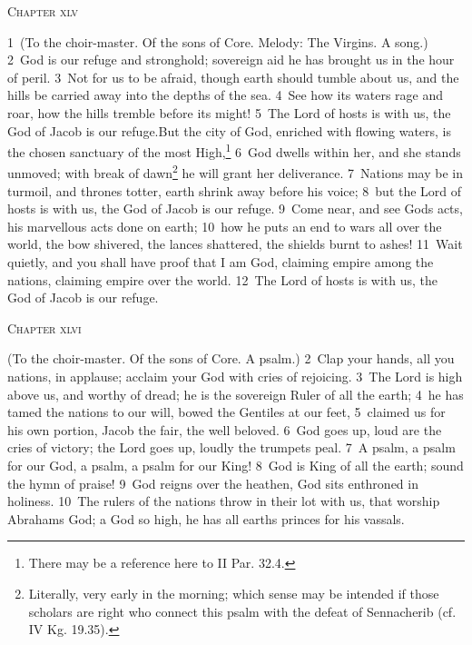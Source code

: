 \documentclass[10pt]{book} %
\begin{document}
\begin{large}\begin{center}\textsc{Chapter xlv}\end{center}\end{large}
\textcolor{benred8}{1}~(To the choir-master. Of the sons of Core. Melody: The Virgins. A song.)
\textcolor{benred8}{2}~God is our refuge and stronghold; sovereign aid he has brought us in the hour of peril. \textcolor{benred8}{3}~Not for us to be afraid, though earth should tumble about us, and the hills be carried away into the depths of the sea. \textcolor{benred8}{4}~See how its waters rage and roar, how the hills tremble before its might! \textcolor{benred8}{5}~The Lord of hosts is with us, the God of Jacob is our refuge.But the city of God, enriched with flowing waters, is the chosen sanctuary of the most High,\footnote[1]{There may be a reference here to II Par. 32.4.} \textcolor{benred8}{6}~God dwells within her, and she stands unmoved; with break of dawn\footnote[2]{Literally, \textasciigrave very early in the morning\textquotesingle ; which sense may be intended if those scholars are right who connect this psalm with the defeat of Sennacherib (cf. IV Kg. 19.35).} he will grant her deliverance. \textcolor{benred8}{7}~Nations may be in turmoil, and thrones totter, earth shrink away before his voice; \textcolor{benred8}{8}~but the Lord of hosts is with us, the God of Jacob is our refuge. \textcolor{benred8}{9}~Come near, and see God\textquotesingle s acts, his marvellous acts done on earth; \textcolor{benred8}{10}~how he puts an end to wars all over the world, the bow shivered, the lances shattered, the shields burnt to ashes! \textcolor{benred8}{11}~Wait quietly, and you shall have proof that I am God, claiming empire among the nations, claiming empire over the world. \textcolor{benred8}{12}~The Lord of hosts is with us, the God of Jacob is our refuge.
\begin{large}\begin{center}\textsc{Chapter xlvi}\end{center}\end{large}
(To the choir-master. Of the sons of Core. A psalm.)
\textcolor{benred8}{2}~Clap your hands, all you nations, in applause; acclaim your God with cries of rejoicing. \textcolor{benred8}{3}~The Lord is high above us, and worthy of dread; he is the sovereign Ruler of all the earth; \textcolor{benred8}{4}~he has tamed the nations to our will, bowed the Gentiles at our feet, \textcolor{benred8}{5}~claimed us for his own portion, Jacob the fair, the well beloved. \textcolor{benred8}{6}~God goes up, loud are the cries of victory; the Lord goes up, loudly the trumpets peal. \textcolor{benred8}{7}~A psalm, a psalm for our God, a psalm, a psalm for our King! \textcolor{benred8}{8}~God is King of all the earth; sound the hymn of praise! \textcolor{benred8}{9}~God reigns over the heathen, God sits enthroned in holiness. \textcolor{benred8}{10}~The rulers of the nations throw in their lot with us, that worship Abraham\textquotesingle s God; a God so high, he has all earth\textquotesingle s princes for his vassals.
\end{document}
